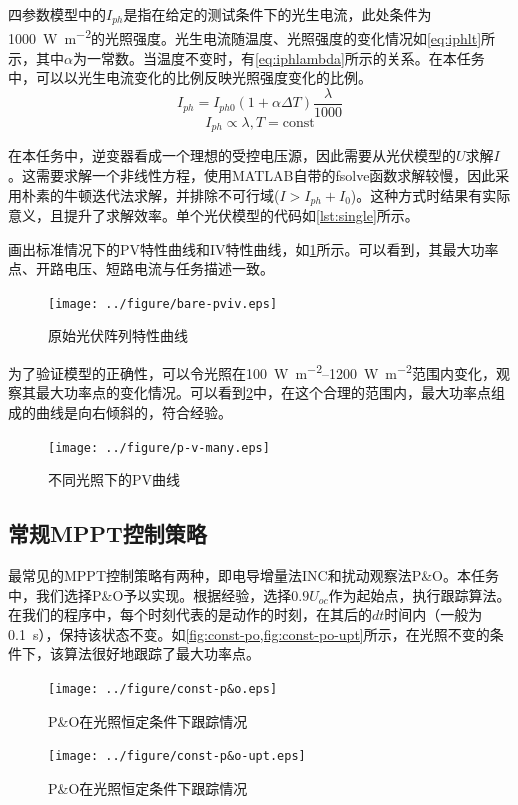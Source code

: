 \documentclass[a4paper,12pt]{article}
\begin{document}
    四参数模型中的$I_{ph}$是指在给定的测试条件下的光生电流，此处条件为\SI{1000}{\W\per\meter\squared}的光照强度。光生电流随温度、光照强度的变化情况如\cref{eq:iphlt}所示，其中$\alpha$为一常数。当温度不变时，有\cref{eq:iphlambda}所示的关系。在本任务中，可以以光生电流变化的比例反映光照强度变化的比例。
    \begin{equation}
        I_{ph}=I_{ph0}(1+\alpha \Delta T)\frac{\lambda}{1000}
        \label{eq:iphlt}
    \end{equation}
    \begin{equation}        
        I_{ph} \propto \lambda, T=\text{const}
        \label{eq:iphlambda}
    \end{equation}
    
    在本任务中，逆变器看成一个理想的受控电压源，因此需要从光伏模型的$U$求解$I$。这需要求解一个非线性方程，使用MATLAB自带的fsolve函数求解较慢，因此采用朴素的牛顿迭代法求解，并排除不可行域($I>I_{ph}+I_0$)。这种方式时结果有实际意义，且提升了求解效率。单个光伏模型的代码如\cref{lst:single}所示。
    
    
    画出标准情况下的PV特性曲线和IV特性曲线，如\cref{fig:bare-pviv}所示。可以看到，其最大功率点、开路电压、短路电流与任务描述一致。    
    \begin{figure}[htbp]
        \centering
        \texttt{[image: ../figure/bare-pviv.eps]}
        \caption{原始光伏阵列特性曲线}
        \label{fig:bare-pviv}
    \end{figure}

    为了验证模型的正确性，可以令光照在\SIrange{100}{1200}{\W\per\meter\squared}范围内变化，观察其最大功率点的变化情况。可以看到\cref{fig:p-v-many}中，在这个合理的范围内，最大功率点组成的曲线是向右倾斜的，符合经验。
    \begin{figure}[htbp]
        \centering
        \texttt{[image: ../figure/p-v-many.eps]}
        \caption{不同光照下的PV曲线}
        \label{fig:p-v-many}
    \end{figure}
    \subsection{常规MPPT控制策略} %
    \label{sub:常规mppt控制策略}
    最常见的MPPT控制策略有两种，即电导增量法INC和扰动观察法P\&O。本任务中，我们选择P\&O予以实现。根据经验，选择$0.9U_{oc}$作为起始点，执行跟踪算法。在我们的程序中，每个时刻代表的是动作的时刻，在其后的$dt$时间内（一般为\SI{0.1}{\s}），保持该状态不变。如\cref{fig:const-po,fig:const-po-upt}所示，在光照不变的条件下，该算法很好地跟踪了最大功率点。
    \begin{figure}[htbp]
        \centering
        \texttt{[image: ../figure/const-p\&o.eps]}
        \caption{P\&O在光照恒定条件下跟踪情况}
        \label{fig:const-po}
    \end{figure}
    \begin{figure}[htbp]
        \centering
        \texttt{[image: ../figure/const-p\&o-upt.eps]}
        \caption{P\&O在光照恒定条件下跟踪情况}
        \label{fig:const-po-upt}
    \end{figure}
\end{document}
